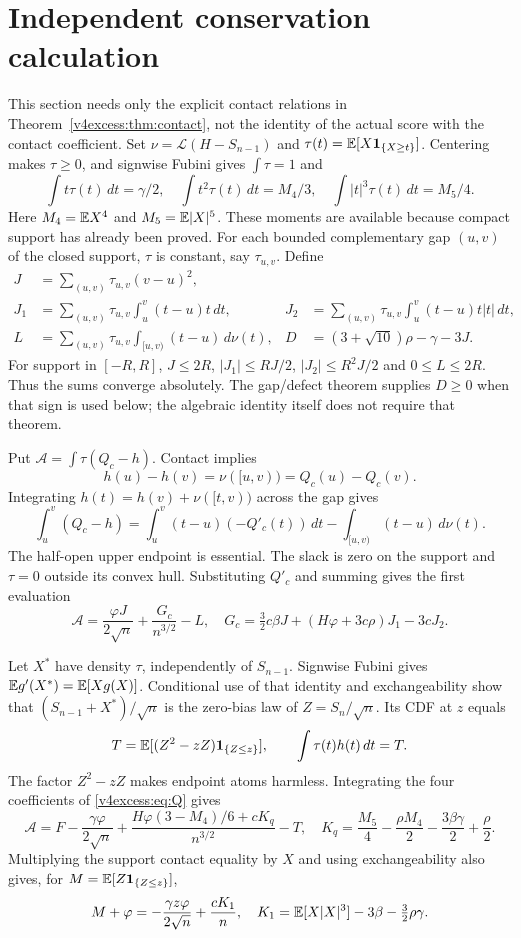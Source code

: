\section{Independent conservation calculation}
This section needs only the explicit contact relations in
Theorem~\ref{v4excess:thm:contact}, not the identity of the actual score with the
contact coefficient. Set $\nu=\mathcal L(H-S_{n-1})$ and
$\tau(t)=\mathbb E[X\mathbf 1_{\{X\ge t\}}]$. Centering makes $\tau\ge0$, and
signwise Fubini gives $\int\tau=1$ and
\[
 \int t\tau(t)\,dt=\gamma/2,\quad
 \int t^2\tau(t)\,dt=M_4/3,\quad
 \int |t|^3\tau(t)\,dt=M_5/4.
\]
Here $M_4=\mathbb E X^4$ and $M_5=\mathbb E|X|^5$.
These moments are available because compact support has already been
proved. For each bounded complementary gap $(u,v)$ of the closed support,
$\tau$ is constant, say $\tau_{u,v}$. Define
\begin{align*}
 J&=\sum_{(u,v)}\tau_{u,v}(v-u)^2,\\
 J_1&=\sum_{(u,v)}\tau_{u,v}\int_u^v(t-u)t\,dt,
 &J_2&=\sum_{(u,v)}\tau_{u,v}\int_u^v(t-u)t|t|\,dt,\\
 L&=\sum_{(u,v)}\tau_{u,v}\int_{[u,v)}(t-u)\,d\nu(t),
 &D&=(3+\sqrt{10})\rho-\gamma-3J.
\end{align*}
For support in $[-R,R]$, $J\le2R$, $|J_1|\le RJ/2$,
$|J_2|\le R^2J/2$ and $0\le L\le2R$. Thus the sums converge absolutely.
The gap/defect theorem supplies $D\ge0$ when that sign is used below;
the algebraic identity itself does not require that theorem.

Put $\mathcal A=\int\tau(Q_c-h)$. Contact implies
\[
 h(u)-h(v)=\nu([u,v))=Q_c(u)-Q_c(v).
\]
Integrating $h(t)=h(v)+\nu([t,v))$ across the gap gives
\[
 \int_u^v(Q_c-h)
 =\int_u^v(t-u)(-Q'_c(t))\,dt-\int_{[u,v)}(t-u)\,d\nu(t).
\]
The half-open upper endpoint is essential. The slack is zero on the
support and $\tau=0$ outside its convex hull. Substituting $Q'_c$ and
summing gives the first evaluation
\begin{equation}\label{v4excess:eq:first}
 \mathcal A=\frac{\varphi J}{2\sqrt n}+\frac{G_c}{n^{3/2}}-L,
 \quad G_c=\tfrac32c\beta J+(H\varphi+3c\rho)J_1-3cJ_2.
\end{equation}

Let $X^*$ have density $\tau$, independently of $S_{n-1}$. Signwise
Fubini gives $\mathbb E g'(X^*)=\mathbb E[Xg(X)]$. Conditional use of that identity
and exchangeability show that $(S_{n-1}+X^*)/\sqrt n$ is the zero-bias
law of $Z=S_n/\sqrt n$. Its CDF at $z$ equals
\[
 T=\mathbb E[(Z^2-zZ)\mathbf 1_{\{Z\le z\}}],
 \qquad\int\tau(t)h(t)\,dt=T.
\]
The factor $Z^2-zZ$ makes endpoint atoms harmless. Integrating the four
coefficients of \eqref{v4excess:eq:Q} gives
\begin{equation}\label{v4excess:eq:second}
 \mathcal A=F-\frac{\gamma\varphi}{2\sqrt n}
 +\frac{H\varphi(3-M_4)/6+cK_q}{n^{3/2}}-T,
 \quad K_q=\frac{M_5}4-\frac{\rho M_4}2-\frac{3\beta\gamma}2+\frac\rho2.
\end{equation}
Multiplying the support contact equality by $X$ and using exchangeability
also gives, for $M=\mathbb E[Z\mathbf 1_{\{Z\le z\}}]$,
\begin{equation}\label{v4excess:eq:firstmoment}
 M+\varphi=-\frac{\gamma z\varphi}{2\sqrt n}+\frac{cK_1}{n},
 \quad K_1=\mathbb E[X|X|^3]-3\beta-\tfrac32\rho\gamma.
\end{equation}

